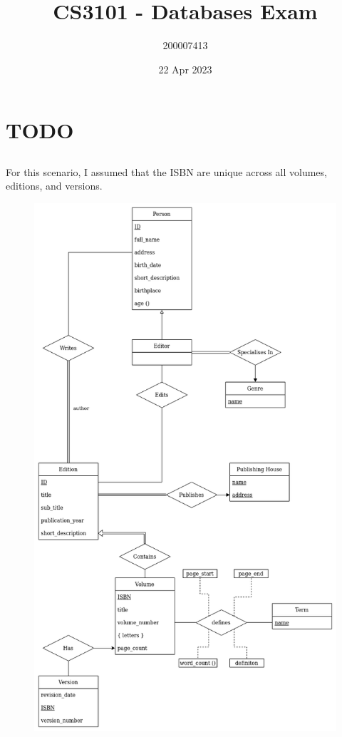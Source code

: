 \documentclass[11pt]{article}
\title{CS3101 - Databases Exam}
\author{200007413}
\date{22 Apr 2023}
\begin{document}
    \maketitle

    \section{TODO}
    
    \subsection{}

    For this scenario, I assumed that the ISBN are unique across all volumes,
    editions, and versions.

    \begin{figure}[H]
        \centering
        \includegraphics[width=0.8\linewidth]{Q1.png}
    \end{figure}
\end{document}
